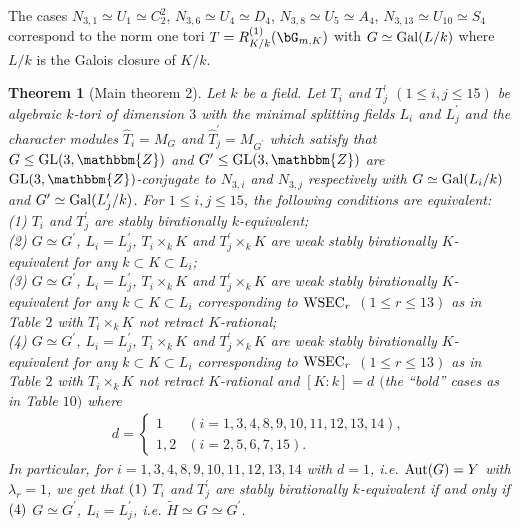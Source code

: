 \documentclass{amsart}
\theoremstyle{plain}
\newtheorem{theorem}{Theorem}[section]
\theoremstyle{definition}
\theoremstyle{remark}
\newcommand{\bZ}{\mathbbm{Z}}\newcommand{\bQ}{\mathbbm{Q}}
\newcommand{\GL}{{\rm GL}}\newcommand{\SL}{{\rm SL}}
\newcounter{sub}\def\tr{\mbox{tr }}
\begin{document}
The cases $N_{3,1}\simeq U_1\simeq C_2^2$, 
$N_{3,6}\simeq U_4\simeq D_4$, 
$N_{3,8}\simeq U_5\simeq A_4$, 
$N_{3,13}\simeq U_{10}\simeq S_4$ 
correspond to the norm one tori 
$T=R^{(1)}_{K/k}(\bG_{m,K})$ with $G\simeq {\rm Gal}(L/k)$ where 
$L/k$ is the Galois closure of $K/k$. 
\vspace*{2mm}

%
\begin{theorem}[Main theorem 2]\label{thmain2}
Let $k$ be a field.  
Let $T_i$ and $T_j^\prime$ $(1\leq i,j\leq 15)$ 
be algebraic $k$-tori of dimension $3$ 
with the minimal splitting fields $L_i$ and $L^\prime_j$ 
and the character modules 
$\widehat{T}_i=M_G$ and $\widehat{T}^\prime_j=M_{G^\prime}$ 
which satisfy that 
$G\leq \GL(3,\bZ)$ and 
$G^\prime\leq \GL(3,\bZ)$ are 
$\GL(3,\bZ)$-conjugate to $N_{3,i}$ and $N_{3,j}$ respectively 
with $G\simeq {\rm Gal}(L_i/k)$ and 
$G^\prime\simeq {\rm Gal}(L_j^\prime/k)$. 
For $1\leq i,j\leq 15$, 
the following conditions are equivalent:\\
{\rm (1)} $T_i$ and $T_j^\prime$ are stably birationally $k$-equivalent;\\
{\rm (2)} 
$G\simeq G^\prime$, 
$L_i=L_j^\prime$, 
$T_i\times_k K$ and $T_j^\prime\times_k K$ 
are weak stably birationally $K$-equivalent 
for any $k\subset K\subset L_i$;\\
{\rm (3)} 
$G\simeq G^\prime$, 
$L_i=L_j^\prime$, 
$T_i\times_k K$ and $T_j^\prime\times_k K$ 
are weak stably birationally $K$-equivalent 
for any $k\subset K\subset L_i$ corresponding to 
${\rm WSEC}_r$ $(1\leq r\leq 13)$ as in Table $2$ 
with $T_i\times_k K$ not retract $K$-rational;\\
{\rm (4)} 
$G\simeq G^\prime$, 
$L_i=L_j^\prime$, 
$T_i\times_k K$ and $T_j^\prime\times_k K$ 
are weak stably birationally $K$-equivalent 
for any $k\subset K\subset L_i$ corresponding to 
${\rm WSEC}_r$ $(1\leq r\leq 13)$ as in Table $2$ 
with $T_i\times_k K$ not retract $K$-rational 
and $[K:k]=d$ 
$($the ``bold'' cases as in {\rm Table} $10$$)$ where 
\begin{align*}
d=
\begin{cases}
1&(i=1,3,4,8,9,10,11,12,13,14),\\
1,2&(i=2,5,6,7,15).
\end{cases}
\end{align*}
In particular, for $i=1,3,4,8,9,10,11,12,13,14$ with $d=1$, 
i.e. ${\rm Aut}(G)=Y$ with $\lambda_{r}=1$, 
we get that 
${(\rm 1)}$ $T_i$ and $T_j^\prime$ are stably birationally $k$-equivalent 
if and only if ${(\rm 4)}$ $G\simeq G^\prime$, $L_i=L_j^\prime$, 
i.e. $\widetilde{H}\simeq G\simeq G^\prime$. 


\end{theorem}
\end{document}
